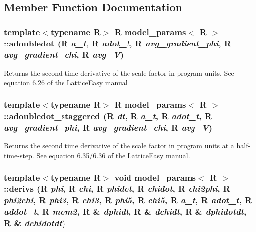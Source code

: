 \subsection{Member Function Documentation}
\hypertarget{structmodel__params_ad35516eb94a6c0dc6d5372d1376f1980}{
\subsubsection[{adoubledot}]{\setlength{\rightskip}{0pt plus 5cm}template$<$typename R$>$ R {\bf model\_\-params}$<$ R $>$::adoubledot (R {\em a\_\-t}, \/  R {\em adot\_\-t}, \/  R {\em avg\_\-gradient\_\-phi}, \/  R {\em avg\_\-gradient\_\-chi}, \/  R {\em avg\_\-V})}}
\label{structmodel__params_ad35516eb94a6c0dc6d5372d1376f1980}


Returns the second time derivative of the scale factor in program units. See equation 6.26 of the LatticeEasy manual. \hypertarget{structmodel__params_ac95d2efa5a5b568aea61917b3765544c}{
\subsubsection[{adoubledot\_\-staggered}]{\setlength{\rightskip}{0pt plus 5cm}template$<$typename R$>$ R {\bf model\_\-params}$<$ R $>$::adoubledot\_\-staggered (R {\em dt}, \/  R {\em a\_\-t}, \/  R {\em adot\_\-t}, \/  R {\em avg\_\-gradient\_\-phi}, \/  R {\em avg\_\-gradient\_\-chi}, \/  R {\em avg\_\-V})}}
\label{structmodel__params_ac95d2efa5a5b568aea61917b3765544c}


Returns the second time derivative of the scale factor in program units at a half-\/time-\/step. See equation 6.35/6.36 of the LatticeEasy manual. \hypertarget{structmodel__params_a62e7a6b400316ea05112fa84110eb632}{
\subsubsection[{derivs}]{\setlength{\rightskip}{0pt plus 5cm}template$<$typename R$>$ void {\bf model\_\-params}$<$ R $>$::derivs (R {\em phi}, \/  R {\em chi}, \/  R {\em phidot}, \/  R {\em chidot}, \/  R {\em chi2phi}, \/  R {\em phi2chi}, \/  R {\em phi3}, \/  R {\em chi3}, \/  R {\em phi5}, \/  R {\em chi5}, \/  R {\em a\_\-t}, \/  R {\em adot\_\-t}, \/  R {\em addot\_\-t}, \/  R {\em mom2}, \/  R \& {\em dphidt}, \/  R \& {\em dchidt}, \/  R \& {\em dphidotdt}, \/  R \& {\em dchidotdt})}}
\label{structmodel__params_a62e7a6b400316ea05112fa84110eb632}


